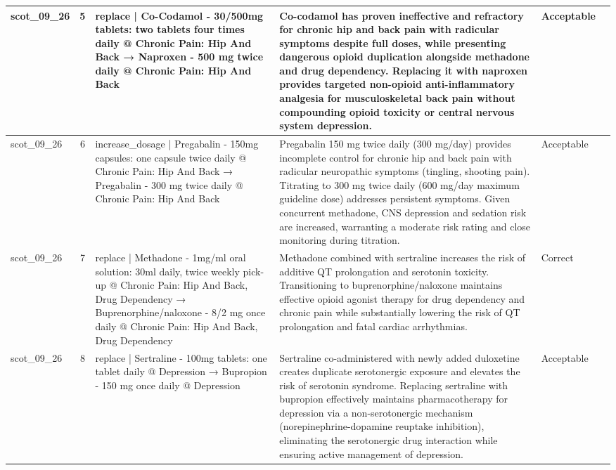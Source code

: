 \begin{longtable}{|p{1.45cm}|c|p{3.3cm}|p{6.5cm}|p{1.55cm}|p{2.3cm}|}
\hline
scot\_09\_26 & 5 & replace | Co-Codamol - 30/500mg tablets: two tablets four times daily @ Chronic Pain: Hip And Back → Naproxen - 500 mg twice daily @ Chronic Pain: Hip And Back & Co-codamol has proven ineffective and refractory for chronic hip and back pain with radicular symptoms despite full doses, while presenting dangerous opioid duplication alongside methadone and drug dependency. Replacing it with naproxen provides targeted non-opioid anti-inflammatory analgesia for musculoskeletal back pain without compounding opioid toxicity or central nervous system depression. & Acceptable &  \\
\hline
scot\_09\_26 & 6 & increase\_dosage | Pregabalin - 150mg capsules: one capsule twice daily @ Chronic Pain: Hip And Back → Pregabalin - 300 mg twice daily @ Chronic Pain: Hip And Back & Pregabalin 150 mg twice daily (300 mg/day) provides incomplete control for chronic hip and back pain with radicular neuropathic symptoms (tingling, shooting pain). Titrating to 300 mg twice daily (600 mg/day maximum guideline dose) addresses persistent symptoms. Given concurrent methadone, CNS depression and sedation risk are increased, warranting a moderate risk rating and close monitoring during titration. & Acceptable &  \\
\hline
scot\_09\_26 & 7 & replace | Methadone - 1mg/ml oral solution: 30ml daily, twice weekly pick-up @ Chronic Pain: Hip And Back, Drug Dependency → Buprenorphine/naloxone - 8/2 mg once daily @ Chronic Pain: Hip And Back, Drug Dependency & Methadone combined with sertraline increases the risk of additive QT prolongation and serotonin toxicity. Transitioning to buprenorphine/naloxone maintains effective opioid agonist therapy for drug dependency and chronic pain while substantially lowering the risk of QT prolongation and fatal cardiac arrhythmias. & Correct &  \\
\hline
scot\_09\_26 & 8 & replace | Sertraline - 100mg tablets: one tablet daily @ Depression → Bupropion - 150 mg once daily @ Depression & Sertraline co-administered with newly added duloxetine creates duplicate serotonergic exposure and elevates the risk of serotonin syndrome. Replacing sertraline with bupropion effectively maintains pharmacotherapy for depression via a non-serotonergic mechanism (norepinephrine-dopamine reuptake inhibition), eliminating the serotonergic drug interaction while ensuring active management of depression. & Acceptable &  \\
\hline
\end{longtable}
